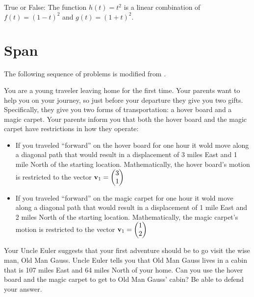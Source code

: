 \begin{problem}
    True or False: The function $h(t) = t^2$ is a linear combination of $f(t) = (1-t)^2$
    and $g(t) = (1+t)^2$.
\end{problem}
% 
%             


\section{Span}
The following sequence of problems is modified from \cite{carpet}.
\begin{problem}
    You are a young traveler leaving home for the first time.  Your parents want to help
    you on your journey, so just before your departure they give you two gifts.
    Specifically, they give you two forms of transportation: a hover board and a magic
    carpet.  Your parents inform you that both the hover board and the magic carpet have
    restrictions in how they operate:
    \begin{itemize}
        \item If you traveled ``forward'' on the hover board for one hour it wold move along a
            diagonal path that would result in a displacement of 3 miles East and 1 mile
            North of the starting location.  Mathematically, the hover board's motion is
            restricted to the vector ${\bf v}_1 = \begin{pmatrix} 3\\1\end{pmatrix}$
        \item If you traveled ``forward'' on the magic carpet for one hour it wold move along a
            diagonal path that would result in a displacement of 1 mile East and 2 miles
            North of the starting location.  Mathematically, the magic carpet's motion is
            restricted to the vector ${\bf v}_1 = \begin{pmatrix} 1\\2\end{pmatrix}$
    \end{itemize}
    Your Uncle Euler suggests that your first adventure should be to go visit the wise
    man, Old Man Gauss.  Uncle Euler tells you that Old Man Gauss lives in a cabin that is
    107 miles East and 64 miles North of your home.  Can you use the hover board and the
    magic carpet to get to Old Man Gauss' cabin?  Be able to defend your answer.
\end{problem}

